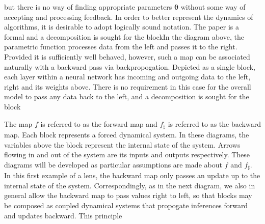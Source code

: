 \documentclass[10pt,a4paper]{article}
\begin{document}
but there is no way of finding appropriate parameters $\boldsymbol\theta$ without some way of accepting and processing feedback.
In order to better represent the dynamics of algorithms, it is desirable to adopt logically sound notation.
The paper \cite{cruttwell2024deeplearningparametriclenses} is a formal  and a decomposition is sought for the blockIn the diagram above, the parametric function processes data from the left and passes it to the right.
Provided it is sufficiently well behaved, however, such a map can be associated naturally with a backward pass via backpropogation.
Depicted as a single block, each layer within a neural network has incoming and outgoing data to the left, right and its weights above.
There is no requirement in this case for the overall model to pass any data back to the left, and a decomposition is sought for the block
\begin{figure}[H]
\centering
{}
\end{figure}
The map $f$ is referred to as the forward map and $f_\sharp$ is referred to as the backward map.
Each block represents a forced dynamical system.
In these diagrams, the variables above the block represent the internal state of the system.
Arrows flowing in and out of the system are its inputs and outputs respectively.
These diagrams will be developed as particular assumptions are made about $f$ and $f_\sharp$.
In this first example of a lens, the backward map only passes an update up to the internal state of the system.
Correspondingly, as in the next diagram, we also in general allow the backward map to pass values right to left, so that blocks may be composed as coupled dynamical systems that propogate inferences forward and updates backward.
This principle 
\end{document}
